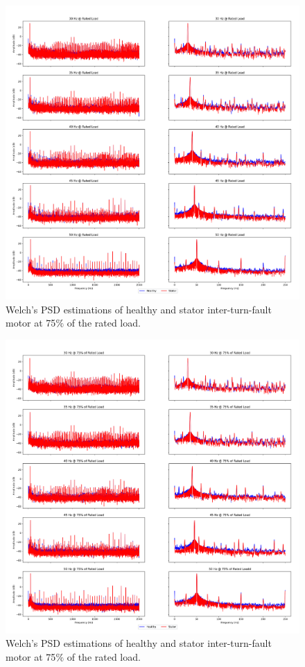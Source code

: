 \pagebreak
\begin{figure}[p]
	\centering
	\includegraphics[width=0.75\paperwidth,keepaspectratio=true]{./fig/psdstator_100.png}
	\caption{Welch's PSD estimations of healthy and stator inter-turn-fault motor at 75$\%$ of the rated load.}	
	\label{psdstator100}
\end{figure}
\pagebreak
\begin{figure}[p]
	\centering
	\includegraphics[width=0.75\paperwidth,keepaspectratio=true]{./fig/psdstator_75.png}
	\caption{Welch's PSD estimations of healthy and stator inter-turn-fault motor at 75$\%$ of the rated load.}	
	\label{psdstator75}
\end{figure}
